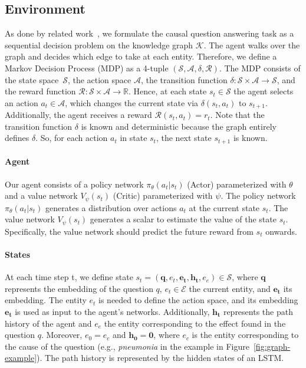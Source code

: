 \subsection{Environment}
\label{subsec:env}
As done by related work~\cite{Xiong2017DeePpath, Das2018Minerva, Qiu2020Stepwise}, we formulate the causal question answering task as a sequential decision problem on the knowledge graph $\mathcal{K}$. The agent walks over the graph and decides which edge to take at each entity. Therefore, we define a Markov Decision Process (MDP) as a 4-tuple $(\mathcal{S}, \mathcal{A}, \delta, \mathcal{R})$. The MDP consists of the state space~$\mathcal{S}$, the action space $\mathcal{A}$, the transition function $\delta : \mathcal{S} \times \mathcal{A} \rightarrow \mathcal{S}$, and the reward function $\mathcal{R} : \mathcal{S} \times \mathcal{A} \rightarrow \mathbb{R}$. Hence, at each state $s_t \in \mathcal{S}$ the agent selects an action $a_t \in \mathcal{A}$, which changes the current state via $\delta(s_t, a_t)$ to $s_{t+1}$. Additionally, the agent receives a reward $\mathcal{R}(s_{t}, a_t) = r_t$. Note that the transition function $\delta$ is known and deterministic because the graph entirely defines $\delta$. So, for each action $a_t$ in state $s_t$, the next state $s_{t+1}$ is known.

\paragraph{Agent} Our agent consists of a policy network $\pi_{\theta} (a_t | s_t)$ (Actor) parameterized with $\theta$ and a value network $V_{\psi}(s_t)$ (Critic) parameterized with $\psi$. The policy network $\pi_{\theta} (a_t | s_t)$ generates
 a distribution over actions $a_t$ at the current state $s_t$. The value network
$V_{\psi}(s_t)$ generates a scalar to estimate the value of the state $s_t$.
Specifically, the value network should predict the future reward from $s_t$ onwards.

\paragraph{States} At each time step t, we define state $s_t = (\mathbf{q}, e_t, \mathbf{e_t}, \mathbf{h_t}, e_e) \in \mathcal{S}$,
where $\mathbf{q}$ represents the embedding of the question $q$, $e_t \in \mathcal{E}$ the current entity, and $\mathbf{e_t}$ its embedding. 
The entity $e_t$ is needed to define the action space, and its embedding $\mathbf{e_t}$ is used as input to the agent's networks.
Additionally, $\mathbf{h_t}$ represents the path history of the agent and $e_e$ the entity corresponding to the effect found in the question $q$.
Moreover, $e_0 = e_c$ and $\mathbf{h_0} = \mathbf{0}$, where $e_c$ is the entity 
corresponding to the cause of the question (e.g., \textit{pneumonia} in the example in 
Figure~\ref{fig:graph-example}). The path history is represented by the hidden states of an LSTM. 

